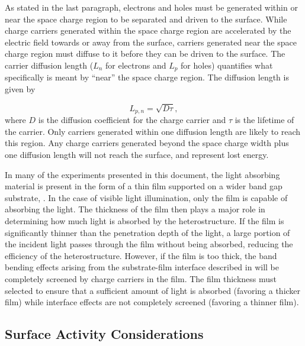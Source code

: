 As stated in the last paragraph, electrons and holes must be generated within or near the
space charge region to be separated and driven to the surface. While charge carriers
generated within the space charge region are accelerated by the electric field towards or
away from the surface, carriers generated near the space charge region must diffuse to it
before they can be driven to the surface.  The carrier diffusion length ($L_{n}$ for
electrons and $L_{p}$ for holes) quantifies what specifically is meant by ``near'' the
space charge region. The diffusion length is given by

\begin{equation}
	\label{fig:diffusionlength}
	L_{p,n}=\sqrt{D\tau},
\end{equation}
where $D$ is the diffusion coefficient for the charge carrier and $\tau$ is the lifetime
of the carrier. Only carriers generated within one diffusion length are likely to reach
this region. Any charge carriers generated beyond the space charge width plus one
diffusion length will not reach the surface, and represent lost energy. 

In many of the experiments presented in this document, the light absorbing 
material is present in the form of a thin film supported on a wider band gap substrate,
. In the case of visible light illumination, only the film is capable of
absorbing the light. The thickness of the film then plays a major role in determining how
much light is absorbed by the heterostructure. If the film is significantly thinner than
the penetration depth of the light, a large portion of the incident light passes through
the film without being absorbed, reducing the efficiency of the heterostructure. However,
if the film is too thick, the band bending effects arising from the substrate-film
interface described in  will be completely screened by
charge carriers in the film. The film thickness must selected to ensure that a sufficient
amount of light is absorbed (favoring a thicker film) while interface effects are not
completely screened (favoring a thinner film).


\subsection{Surface Activity Considerations}
\label{subsec:background.surfaceactivity}



